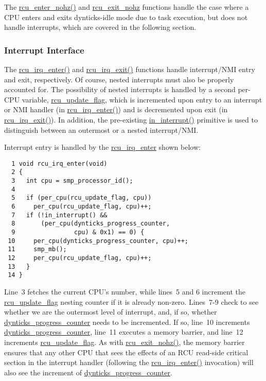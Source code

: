 The \url{rcu_enter_nohz()} and \url{rcu_exit_nohz}
functions handle the case where a CPU enters and exits dynticks-idle
mode due to task execution, but does not handle interrupts, which are
covered in the following section.

\subsubsection{Interrupt Interface}
\label{app:formal:Interrupt Interface}

The \url{rcu_irq_enter()} and \url{rcu_irq_exit()}
functions handle interrupt/NMI entry and exit, respectively.
Of course, nested interrupts must also be properly accounted for.
The possibility of nested interrupts is handled by a second per-CPU
variable, \url{rcu_update_flag}, which is incremented upon
entry to an interrupt or NMI handler (in \url{rcu_irq_enter()})
and is decremented upon exit (in \url{rcu_irq_exit()}).
In addition, the pre-existing \url{in_interrupt()} primitive is
used to distinguish between an outermost or a nested interrupt/NMI.

Interrupt entry is handled by the \url{rcu_irq_enter}
shown below:

{ \scriptsize
\begin{verbatim}
  1 void rcu_irq_enter(void)
  2 {
  3   int cpu = smp_processor_id();
  4 
  5   if (per_cpu(rcu_update_flag, cpu))
  6     per_cpu(rcu_update_flag, cpu)++;
  7   if (!in_interrupt() &&
  8       (per_cpu(dynticks_progress_counter,
  9                cpu) & 0x1) == 0) {
 10     per_cpu(dynticks_progress_counter, cpu)++;
 11     smp_mb();
 12     per_cpu(rcu_update_flag, cpu)++;
 13   }
 14 }
\end{verbatim}
}

Line~3 fetches the current CPU's number, while lines~5 and 6
increment the \url{rcu_update_flag} nesting counter if it
is already non-zero.
Lines~7-9 check to see whether we are the outermost level of
interrupt, and, if so, whether \url{dynticks_progress_counter}
needs to be incremented.
If so, line~10 increments \url{dynticks_progress_counter},
line~11 executes a memory barrier, and line~12 increments
\url{rcu_update_flag}.
As with \url{rcu_exit_nohz()}, the memory barrier ensures that
any other CPU that sees the effects of an RCU read-side critical section
in the interrupt handler (following the \url{rcu_irq_enter()}
invocation) will also see the increment of
\url{dynticks_progress_counter}.

